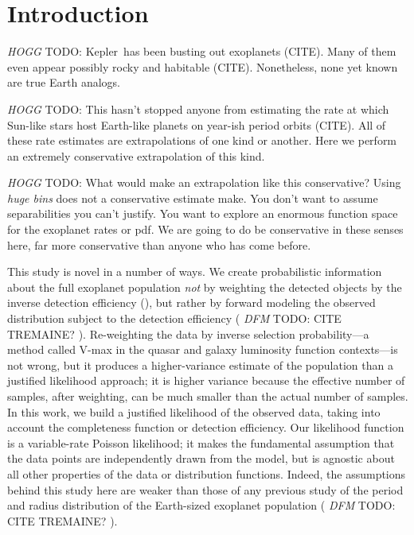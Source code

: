 \documentclass[12pt,preprint]{aastex}
\newcommand{\project}[1]{{\sffamily #1}}
\newcommand{\kepler}{\project{Kepler}}
\newcommand{\todo}[3]{{\color{#2} \emph{#1} TODO: #3}}
\newcommand{\dfmtodo}[1]{\todo{DFM}{red}{#1}}
\newcommand{\hoggtodo}[1]{\todo{HOGG}{blue}{#1}}
\begin{document}

\section{Introduction}

\hoggtodo{
\kepler\ has been busting out exoplanets (CITE).
Many of them even appear possibly rocky and habitable (CITE).
Nonetheless, none yet known are true Earth analogs.
}

\hoggtodo{
This hasn't stopped anyone from estimating the rate at which Sun-like stars
host Earth-like planets on year-ish period orbits (CITE).
All of these rate estimates are extrapolations of one kind or another.
Here we perform an extremely conservative extrapolation of this kind.
}

\hoggtodo{
What would make an extrapolation like this conservative?
Using \emph{huge bins} does not a conservative estimate make.
You don't want to assume separabilities you can't justify.
You want to explore an enormous function space for the exoplanet rates or pdf.
We are going to do be conservative in these senses here, far more conservative
than anyone who has come before.
}

This study is novel in a number of ways.
We create probabilistic information about the full exoplanet population
\emph{not} by weighting the detected objects by the inverse detection
efficiency (\citealt{petigura}), but rather by forward modeling the
observed distribution subject to the detection efficiency
(\dfmtodo{CITE TREMAINE?} \citealt{dong}).
Re-weighting the data by inverse selection probability---a method called
V-max in the quasar and galaxy luminosity function contexts---is not wrong,
but it produces a higher-variance estimate of the population than a justified
likelihood approach; it is higher variance because
the effective number of samples, after
weighting, can be much smaller than the actual number of samples.
In this work, we build a justified
likelihood of the observed data, taking into account the completeness function
or detection efficiency.
Our likelihood function is a variable-rate Poisson likelihood; it makes the
fundamental assumption that the data points are independently drawn from the
model, but is agnostic about all other properties of the data or distribution
functions.
Indeed, the assumptions behind this study here are weaker than those of any
previous study of the period and radius distribution of the Earth-sized
exoplanet population (\dfmtodo{CITE TREMAINE?} \citealt{dong, petigura}).
\end{document}
